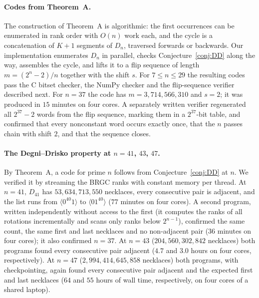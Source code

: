 \documentclass[11pt]{article}
\begin{document}
\paragraph{Codes from Theorem~A.} The construction of Theorem~A is algorithmic: the first occurrences can be
enumerated in rank order with $O(n)$ work each, and the cycle is a concatenation of $K+1$ segments of $D_n$, traversed
forwards or backwards. Our implementation enumerates $D_n$ in parallel, checks Conjecture~\ref{conj:DD} along the way,
assembles the cycle, and lifts it to a flip sequence of length $m=(2^n-2)/n$ together with the shift $s$. For
$7\le n\le29$ the resulting codes pass the C bitset checker, the NumPy checker and the flip-sequence verifier described
next. For $n=37$ the code has $m=3{,}714{,}566{,}310$ and $s=2$; it
was produced in $15$ minutes on four cores. A separately written verifier regenerated all $2^{37}-2$ words from the
flip sequence, marking them in a $2^{37}$-bit table, and confirmed that every nonconstant word occurs exactly once,
that the $n$ passes chain with shift $2$, and that the sequence closes.

\paragraph{The Degni--Drisko property at $n=41$, $43$, $47$.} By Theorem~A, a code for prime $n$ follows from
Conjecture~\ref{conj:DD} at $n$. We verified it by streaming the BRGC ranks with constant memory per thread. At $n=41$,
$D_{41}$ has $53{,}634{,}713{,}550$ necklaces, every consecutive pair is adjacent, and the list runs from
$\langle0^{40}1\rangle$ to $\langle01^{40}\rangle$ ($77$ minutes on four cores). A second program, written
independently without access to the first (it computes the ranks of all rotations incrementally and scans only ranks
below $2^{n-1}$), confirmed the same count, the same first and last necklaces and no non-adjacent pair ($36$ minutes on
four cores); it also confirmed $n=37$. At $n=43$ ($204{,}560{,}302{,}842$ necklaces) both programs found every
consecutive pair adjacent ($4.7$ and $3.0$ hours on four cores, respectively). At $n=47$ ($2{,}994{,}414{,}645{,}858$ necklaces)
both programs, with checkpointing, again found every consecutive pair adjacent and the expected first and last
necklaces ($64$ and $55$ hours of wall time, respectively, on four cores of a shared laptop).
\end{document}
